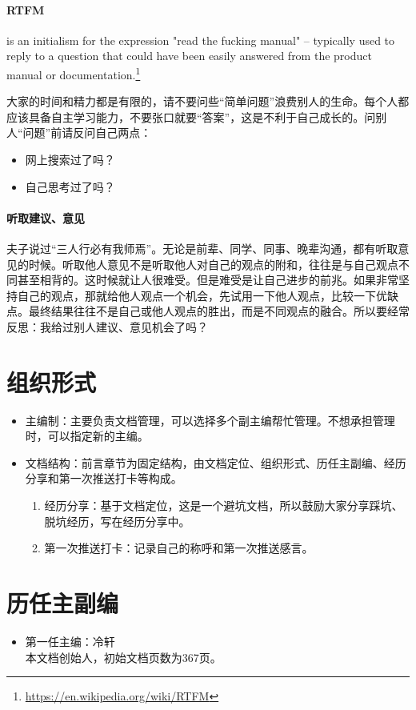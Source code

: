 \documentclass[cn,11pt,chinese,twoside]{elegantbook}
\begin{document}
\paragraph{RTFM} is an initialism for the expression "read the fucking manual" – typically used to reply to a question that could have been easily answered from the product manual or documentation.\footnote{\url{https://en.wikipedia.org/wiki/RTFM}}

大家的时间和精力都是有限的，请不要问些“简单问题”浪费别人的生命。每个人都应该具备自主学习能力，不要张口就要“答案”，这是不利于自己成长的。问别人“问题”前请反问自己两点：
\begin{itemize}
\item 网上搜索过了吗？
\item 自己思考过了吗？
\end{itemize}

\paragraph{听取建议、意见}
夫子说过“三人行必有我师焉”。无论是前辈、同学、同事、晚辈沟通，都有听取意见的时候。听取他人意见不是听取他人对自己的观点的附和，往往是与自己观点不同甚至相背的。这时候就让人很难受。但是难受是让自己进步的前兆。如果非常坚持自己的观点，那就给他人观点一个机会，先试用一下他人观点，比较一下优缺点。最终结果往往不是自己或他人观点的胜出，而是不同观点的融合。所以要经常反思：我给过别人建议、意见机会了吗？



\section*{组织形式}
\begin{itemize}
\item 主编制：主要负责文档管理，可以选择多个副主编帮忙管理。不想承担管理时，可以指定新的主编。
\item 文档结构：前言章节为固定结构，由文档定位、组织形式、历任主副编、经历分享和第一次推送打卡等构成。
\begin{enumerate}
\item 经历分享：基于文档定位，这是一个避坑文档，所以鼓励大家分享踩坑、脱坑经历，写在经历分享中。
\item 第一次推送打卡：记录自己的称呼和第一次推送感言。
\end{enumerate}
\end{itemize}



\section*{历任主副编}
\begin{itemize}
\item 第一任主编：冷轩\\
本文档创始人，初始文档页数为367页。
\end{itemize}
\end{document}
